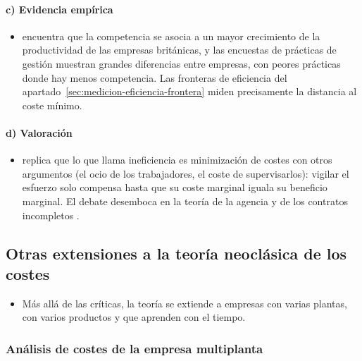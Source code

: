 \documentclass[11pt]{article}
\begin{document}
\paragraph{c) Evidencia empírica}

\begin{itemize}
\item \textcite{Nickell1996Competition} encuentra que la competencia se asocia a un mayor crecimiento de la productividad de las empresas británicas, y las encuestas de prácticas de gestión muestran grandes diferencias entre empresas, con peores prácticas donde hay menos competencia\nocite{BloomVanReenen2007Measuring}. Las fronteras de eficiencia del apartado~\ref{sec:medicion-eficiencia-frontera} miden precisamente la distancia al coste mínimo.
\end{itemize}

\paragraph{d) Valoración}

\begin{itemize}
\item \textcite{Stigler1976Xistence} replica que lo que  llama ineficiencia es minimización de costes con otros argumentos (el ocio de los trabajadores, el coste de supervisarlos): vigilar el esfuerzo solo compensa hasta que su coste marginal iguala su beneficio marginal. El debate desemboca en la teoría de la agencia y de los contratos incompletos .
\end{itemize}

\subsection{Otras extensiones a la teoría neoclásica de los costes}\label{sec:otras-extensiones-teoria}

\begin{itemize}
\item Más allá de las críticas, la teoría se extiende a empresas con varias plantas, con varios productos y que aprenden con el tiempo.
\end{itemize}

\subsubsection{Análisis de costes de la empresa multiplanta}\label{sec:analisis-costes-empresa}
\end{document}
